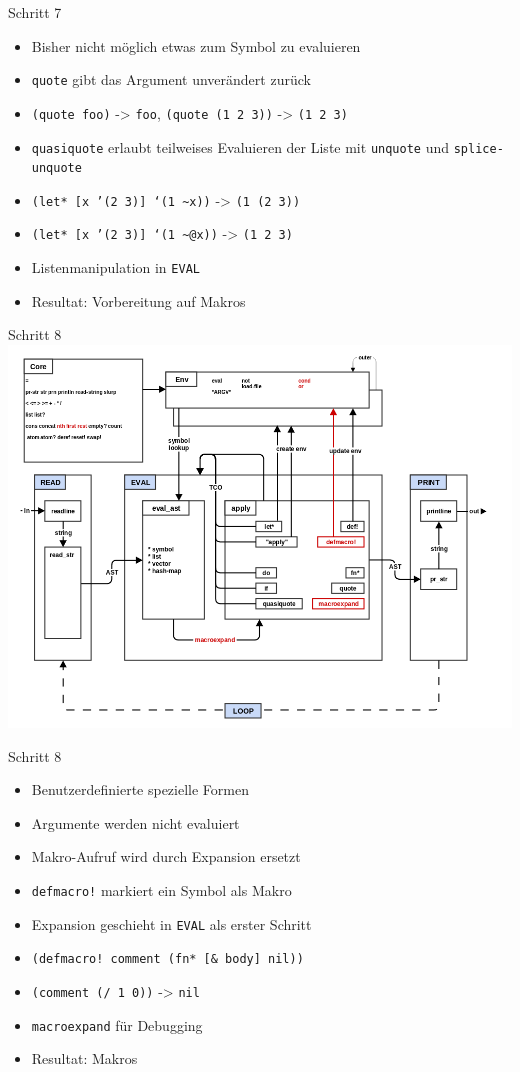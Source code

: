 \documentclass[presentation]{beamer}
\begin{document}
\begin{frame}[fragile,label=sec-3-23]{Schritt 7}
 \begin{itemize}
\item Bisher nicht möglich etwas zum Symbol zu evaluieren
\item \texttt{quote} gibt das Argument unverändert zurück
\item \texttt{(quote foo)} -> \texttt{foo}, \texttt{(quote (1 2 3))} -> \texttt{(1 2 3)}
\item \texttt{quasiquote} erlaubt teilweises Evaluieren der Liste mit \texttt{unquote}
  und \texttt{splice-unquote}
\item \texttt{(let* [x '(2 3)] `(1 \textasciitilde{}x))} -> \texttt{(1 (2 3))}
\item \texttt{(let* [x '(2 3)] `(1 \textasciitilde{}@x))} -> \texttt{(1 2 3)}
\item Listenmanipulation in \texttt{EVAL}
\item Resultat: Vorbereitung auf Makros
\end{itemize}
\end{frame}

\begin{frame}[label=sec-3-24]{Schritt 8}
\includegraphics[width=.9\linewidth]{./images/step8_macros.png}
\end{frame}

\begin{frame}[fragile,label=sec-3-25]{Schritt 8}
 \begin{itemize}
\item Benutzerdefinierte spezielle Formen
\item Argumente werden nicht evaluiert
\item Makro-Aufruf wird durch Expansion ersetzt
\item \texttt{defmacro!} markiert ein Symbol als Makro
\item Expansion geschieht in \texttt{EVAL} als erster Schritt
\item \texttt{(defmacro! comment (fn* [\& body] nil))}
\item \texttt{(comment (/ 1 0))} -> \texttt{nil}
\item \texttt{macroexpand} für Debugging
\item Resultat: Makros
\end{itemize}
\end{frame}
\end{document}
